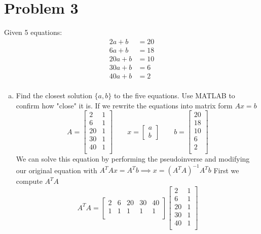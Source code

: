 \documentclass{article}
\begin{document}
\newpage
\section*{Problem 3}
Given 5 equations:
\begin{align*}
 2a + b &= 20 \\
 6a + b &= 18 \\
20a + b &= 10 \\
30a + b &=  6 \\
40a + b &=  2 \\
\end{align*}
\begin{enumerate}[a)]
\item Find the closest solution $\{a,b\}$ to the five equations.
{\color{blue} Use MATLAB to confirm how "close" it is.}
\newline
If we rewrite the equations into matrix form $Ax=b$
$$
A=
\begin{bmatrix}
2 & 1 \\
6 & 1 \\
20 & 1 \\
30 & 1 \\
40 & 1 \\
\end{bmatrix}
\qquad
x =
\begin{bmatrix} a \\ b \end{bmatrix}
\qquad
b =
\begin{bmatrix}
20 \\
18 \\
10 \\
6  \\
2  \\
\end{bmatrix}
$$
We can solve this equation by performing the pseudoinverse and modifying our original equation with $A^TAx=A^Tb \implies x = (A^TA)^{-1}A^Tb$
\newline
First we compute $A^TA$
$$
A^TA
=
\begin{bmatrix}
2 & 6 & 20 & 30 & 40 \\
1 & 1 & 1 & 1 & 1 \\
\end{bmatrix}
\begin{bmatrix}
2  & 1 \\
6  & 1 \\
20 & 1 \\
30 & 1 \\
40 & 1 \\
\end{bmatrix}
$$
\end{enumerate}
\end{document}
